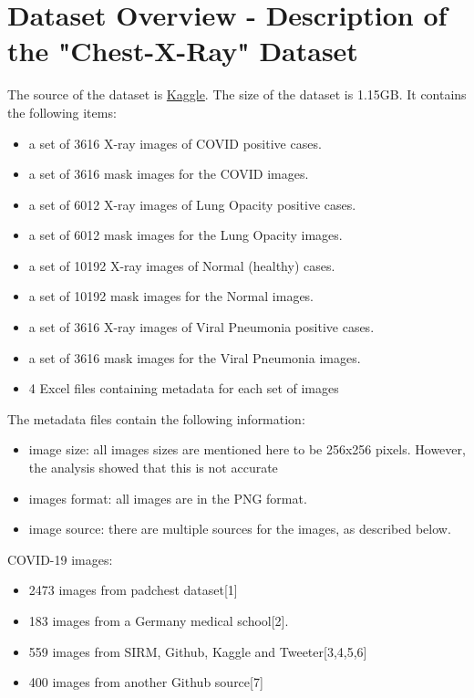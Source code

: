 \documentclass{article}
\begin{document}
\section{Dataset Overview - Description of the "Chest-X-Ray" Dataset}
The source of the dataset is \href{https://www.kaggle.com/tawsifurrahman/covid19-radiography-database} {Kaggle}. The size of the dataset is 1.15GB. It contains the following items:
\begin{itemize}
    \item a set of 3616  X-ray images of COVID positive cases.
    \item a set of 3616 mask images for the COVID images.
    \item a set of 6012  X-ray images of Lung Opacity positive cases.
    \item a set of 6012 mask images for the Lung Opacity images.
    \item a set of 10192  X-ray images of Normal (healthy) cases.
    \item a set of 10192 mask images for the Normal images.
    \item a set of 3616  X-ray images of Viral Pneumonia positive cases.
    \item a set of 3616 mask images for the Viral Pneumonia images.
    \item  4 Excel files containing metadata for each set of images
\end{itemize}

The metadata files contain the following information:
\begin{itemize}
    \item image size: all images sizes are mentioned here to be 256x256 pixels. However, the analysis showed that this is not accurate
    \item images format: all images are in the PNG format.
    \item image source: there are multiple sources for the images, as described below.
\end{itemize}

COVID-19 images:
\begin{itemize}
    \item 2473 images from padchest dataset[1]
    \item 183 images from a Germany medical school[2].
    \item 559 images from SIRM, Github, Kaggle and Tweeter[3,4,5,6]
    \item 400 images from another Github source[7]
\end{itemize}
\end{document}
